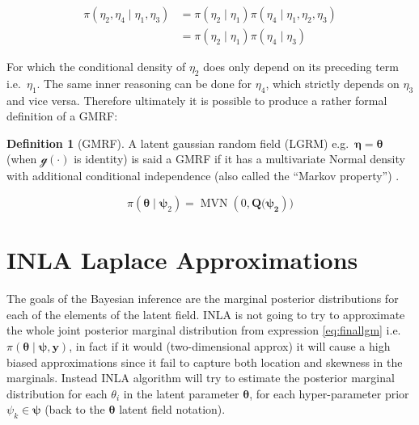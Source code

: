 \documentclass[
  12pt,
  a4paper,
  oneside]{book}
\theoremstyle{definition}
\newtheorem{definition}{Definition}[chapter]
\theoremstyle{definition}
\theoremstyle{definition}
\theoremstyle{remark}
\begin{document}
\begin{equation} 
\begin{split}
  \pi\left(\eta_{2}, \eta_{4} \mid \eta_{1}, \eta_{3}\right) &=\pi\left(\eta_{2} \mid \eta_{1}\right) \pi\left(\eta_{4} \mid \eta_{1}, \eta_{2}, \eta_{3}\right) \\
  & =\pi\left(\eta_{2} \mid \eta_{1}\right) \pi\left(\eta_{4} \mid \eta_{3}\right)
\end{split}
\label{eq:conditinal}
\end{equation}

For which the conditional density of \(\eta_2\) does only depend on its preceding term i.e.~\(\eta_1\). The same inner reasoning can be done for \(\eta_4\), which strictly depends on \(\eta_3\) and vice versa.
Therefore ultimately it is possible to produce a rather formal definition of a GMRF:

\begin{definition}[GMRF]
\protect\hypertarget{def:gmrf}{}{\label{def:gmrf} \iffalse (GMRF) \fi{} }A latent gaussian random field (LGRM) e.g.~\(\boldsymbol\eta = \boldsymbol\theta\) (when \(\mathscr{g}(\cdot)\) is identity) is said a GMRF if it has a multivariate Normal density with additional conditional independence (also called the ``Markov property'') \citep{wang2018bayesian}.
\end{definition}

\[
\pi(\boldsymbol{\theta} \mid \boldsymbol{\psi}_2) = \operatorname{MVN}(0, \boldsymbol{Q(\psi_2}))
\]

\hypertarget{approx}{%
\section{INLA Laplace Approximations}\label{approx}}

The goals of the Bayesian inference are the marginal posterior distributions for each of the elements of the latent field. INLA is not going to try to approximate the whole joint posterior marginal distribution from expression \eqref{eq:finallgm} i.e.~\(\pi(\boldsymbol{\theta} \mid \boldsymbol{\psi}, \boldsymbol{\mathbf{y}})\), in fact if it would (two-dimensional approx) it will cause a high biased approximations since it fail to capture both location and skewness in the marginals. Instead INLA algorithm will try to estimate the posterior marginal distribution for each \(\theta_{i}\) in the latent parameter \(\boldsymbol{\theta}\), for each hyper-parameter prior \(\psi_{k} \in \boldsymbol\psi\) (back to the \(\boldsymbol\theta\) latent field notation).
\end{document}
